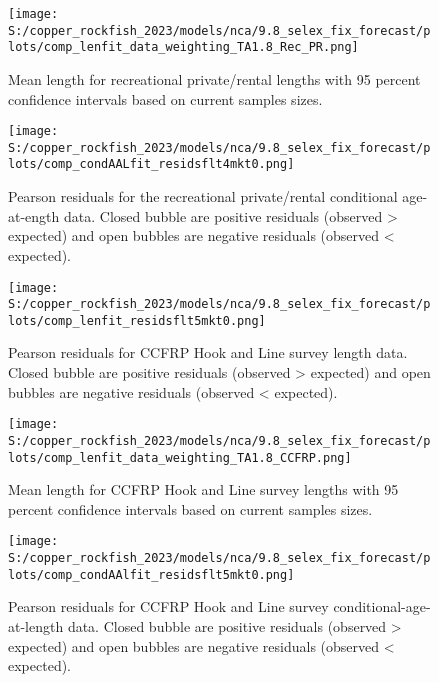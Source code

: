 \documentclass[
  letterpaper,
]{article}
\begin{document}
\pagebreak

\begin{figure}
\centering
\texttt{[image: S:/copper\_rockfish\_2023/models/nca/9.8\_selex\_fix\_forecast/plots/comp\_lenfit\_data\_weighting\_TA1.8\_Rec\_PR.png]}
\caption{Mean length for recreational private/rental lengths with 95 percent confidence intervals based on current samples sizes.\label{fig:rec-pr-mean-len-fit}}
\end{figure}

\pagebreak

\begin{figure}
\centering
\texttt{[image: S:/copper\_rockfish\_2023/models/nca/9.8\_selex\_fix\_forecast/plots/comp\_condAALfit\_residsflt4mkt0.png]}
\caption{Pearson residuals for the recreational private/rental conditional age-at-ength data. Closed bubble are positive residuals (observed \textgreater{} expected) and open bubbles are negative residuals (observed \textless{} expected).\label{fig:rec-pr-age-pearson}}
\end{figure}

\begin{figure}
\centering
\texttt{[image: S:/copper\_rockfish\_2023/models/nca/9.8\_selex\_fix\_forecast/plots/comp\_lenfit\_residsflt5mkt0.png]}
\caption{Pearson residuals for CCFRP Hook and Line survey length data. Closed bubble are positive residuals (observed \textgreater{} expected) and open bubbles are negative residuals (observed \textless{} expected).\label{fig:ccfrp-len-pearson}}
\end{figure}

\pagebreak

\begin{figure}
\centering
\texttt{[image: S:/copper\_rockfish\_2023/models/nca/9.8\_selex\_fix\_forecast/plots/comp\_lenfit\_data\_weighting\_TA1.8\_CCFRP.png]}
\caption{Mean length for CCFRP Hook and Line survey lengths with 95 percent confidence intervals based on current samples sizes.\label{fig:ccfrp-mean-len-fit}}
\end{figure}

\pagebreak

\begin{figure}
\centering
\texttt{[image: S:/copper\_rockfish\_2023/models/nca/9.8\_selex\_fix\_forecast/plots/comp\_condAAlfit\_residsflt5mkt0.png]}
\caption{Pearson residuals for CCFRP Hook and Line survey conditional-age-at-length data. Closed bubble are positive residuals (observed \textgreater{} expected) and open bubbles are negative residuals (observed \textless{} expected).\label{fig:ccfrp-age-pearson}}
\end{figure}
\end{document}
